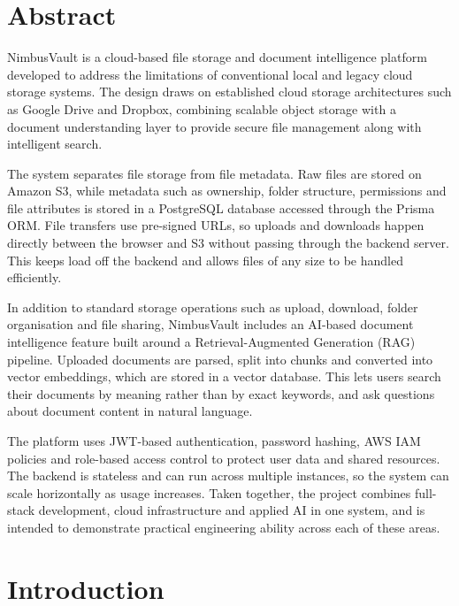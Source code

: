 \documentclass{tietreport}
\author{%
  \texttt{1024030021} Saras \\
  \texttt{1024030020} Mehul Jain \\
  \texttt{1024030012} Mansimar Kaur%
}
\begin{document}
\maketitle
\tableofcontents

\chapter*{Abstract}

NimbusVault is a cloud-based file storage and document intelligence platform developed to address the limitations of conventional local and legacy cloud storage systems. The design draws on established cloud storage architectures such as Google Drive and Dropbox, combining scalable object storage with a document understanding layer to provide secure file management along with intelligent search.

The system separates file storage from file metadata. Raw files are stored on Amazon S3, while metadata such as ownership, folder structure, permissions and file attributes is stored in a PostgreSQL database accessed through the Prisma ORM. File transfers use pre-signed URLs, so uploads and downloads happen directly between the browser and S3 without passing through the backend server. This keeps load off the backend and allows files of any size to be handled efficiently.

In addition to standard storage operations such as upload, download, folder organisation and file sharing, NimbusVault includes an AI-based document intelligence feature built around a Retrieval-Augmented Generation (RAG) pipeline. Uploaded documents are parsed, split into chunks and converted into vector embeddings, which are stored in a vector database. This lets users search their documents by meaning rather than by exact keywords, and ask questions about document content in natural language.

The platform uses JWT-based authentication, password hashing, AWS IAM policies and role-based access control to protect user data and shared resources. The backend is stateless and can run across multiple instances, so the system can scale horizontally as usage increases. Taken together, the project combines full-stack development, cloud infrastructure and applied AI in one system, and is intended to demonstrate practical engineering ability across each of these areas.



\chapter{Introduction}
\end{document}
